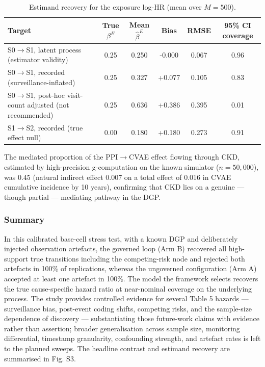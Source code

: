 \documentclass[sn-vancouver-num]{sn-jnl}
\begin{document}
\begin{table}[h]
\caption{Estimand recovery for the exposure log-HR (mean over $M = 500$).}
\label{tab:estimand-recovery}
\centering
\footnotesize
\begin{tabularx}{\textwidth}{@{}Yccccc@{}}
\toprule
\textbf{Target} & \textbf{True $\beta^E$} & \textbf{Mean $\hat{\beta}^E$} & \textbf{Bias} & \textbf{RMSE} & \textbf{95\% CI coverage} \\
\midrule
S0$\rightarrow$S1, latent process (estimator validity) & 0.25 & 0.250 & -0.000 & 0.067 & 0.96 \\
S0$\rightarrow$S1, recorded (surveillance-inflated) & 0.25 & 0.327 & +0.077 & 0.105 & 0.83 \\
S0$\rightarrow$S1, post-hoc visit-count adjusted (not recommended) & 0.25 & 0.636 & +0.386 & 0.395 & 0.01 \\
S1$\rightarrow$S2, recorded (true effect null) & 0.00 & 0.180 & +0.180 & 0.273 & 0.91 \\
\bottomrule
\end{tabularx}
\end{table}

The mediated proportion of the PPI$\rightarrow$CVAE effect flowing through CKD, estimated by high-precision g-computation on the known simulator ($n = 50{,}000$), was 0.45 (natural indirect effect 0.007 on a total effect of 0.016 in CVAE cumulative incidence by 10 years), confirming that CKD lies on a genuine --- though partial --- mediating pathway in the DGP.

\subsubsection{Summary}
In this calibrated base-cell stress test, with a known DGP and deliberately injected observation artefacts, the governed loop (Arm B) recovered all high-support true transitions including the competing-risk node and rejected both artefacts in 100\% of replications, whereas the ungoverned configuration (Arm A) accepted at least one artefact in 100\%. The model the framework selects recovers the true cause-specific hazard ratio at near-nominal coverage on the underlying process. The study provides controlled evidence for several Table 5 hazards --- surveillance bias, post-event coding shifts, competing risks, and the sample-size dependence of discovery --- substantiating those future-work claims with evidence rather than assertion; broader generalisation across sample size, monitoring differential, timestamp granularity, confounding strength, and artefact rates is left to the planned sweeps. The headline contrast and estimand recovery are summarised in Fig. S3.
\end{document}
